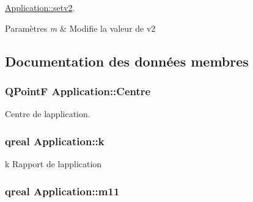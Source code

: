 \hyperlink{class_application_af32de2ec7844f1ff7100fe6754342b82}{Application\+::setv2}. 


\begin{DoxyParams}{Paramètres}
{\em m} & Modifie la valeur de v2 \\
\hline
\end{DoxyParams}


\subsection{Documentation des données membres}
\hypertarget{class_application_a3974036e3edb906d6a27f23f7514c740}{}
\subsubsection[{Centre}]{\setlength{\rightskip}{0pt plus 5cm}Q\+Point\+F Application\+::\+Centre\hspace{0.3cm}{\ttfamily [protected]}}\label{class_application_a3974036e3edb906d6a27f23f7514c740}


Centre de l\textquotesingle{}application. 

\hypertarget{class_application_aa28f2399db4f7c3a48c98d59e62733ea}{}
\subsubsection[{k}]{\setlength{\rightskip}{0pt plus 5cm}qreal Application\+::k\hspace{0.3cm}{\ttfamily [protected]}}\label{class_application_aa28f2399db4f7c3a48c98d59e62733ea}


k Rapport de l\textquotesingle{}application 

\hypertarget{class_application_ae4f71662bf31fcbd52aac06c1741bead}{}
\subsubsection[{m11}]{\setlength{\rightskip}{0pt plus 5cm}qreal Application\+::m11\hspace{0.3cm}{\ttfamily [protected]}}\label{class_application_ae4f71662bf31fcbd52aac06c1741bead}


